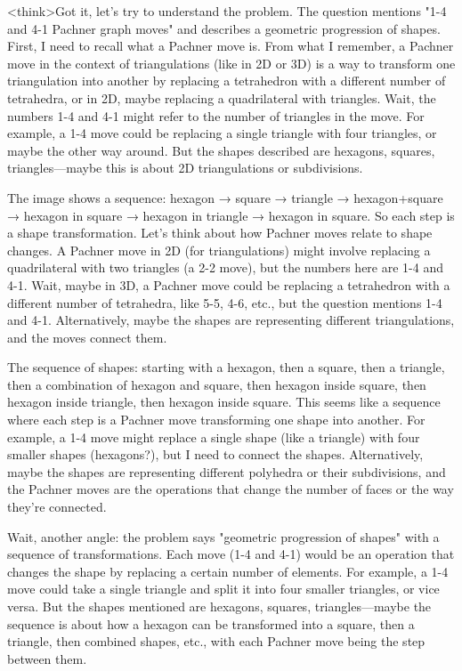 <think>Got it, let's try to understand the problem. The question mentions "1-4 and 4-1 Pachner graph moves" and describes a geometric progression of shapes. First, I need to recall what a Pachner move is. From what I remember, a Pachner move in the context of triangulations (like in 2D or 3D) is a way to transform one triangulation into another by replacing a tetrahedron with a different number of tetrahedra, or in 2D, maybe replacing a quadrilateral with triangles. Wait, the numbers 1-4 and 4-1 might refer to the number of triangles in the move. For example, a 1-4 move could be replacing a single triangle with four triangles, or maybe the other way around. But the shapes described are hexagons, squares, triangles—maybe this is about 2D triangulations or subdivisions.

The image shows a sequence: hexagon → square → triangle → hexagon+square → hexagon in square → hexagon in triangle → hexagon in square. So each step is a shape transformation. Let's think about how Pachner moves relate to shape changes. A Pachner move in 2D (for triangulations) might involve replacing a quadrilateral with two triangles (a 2-2 move), but the numbers here are 1-4 and 4-1. Wait, maybe in 3D, a Pachner move could be replacing a tetrahedron with a different number of tetrahedra, like 5-5, 4-6, etc., but the question mentions 1-4 and 4-1. Alternatively, maybe the shapes are representing different triangulations, and the moves connect them.

The sequence of shapes: starting with a hexagon, then a square, then a triangle, then a combination of hexagon and square, then hexagon inside square, then hexagon inside triangle, then hexagon inside square. This seems like a sequence where each step is a Pachner move transforming one shape into another. For example, a 1-4 move might replace a single shape (like a triangle) with four smaller shapes (hexagons?), but I need to connect the shapes. Alternatively, maybe the shapes are representing different polyhedra or their subdivisions, and the Pachner moves are the operations that change the number of faces or the way they're connected.

Wait, another angle: the problem says "geometric progression of shapes" with a sequence of transformations. Each move (1-4 and 4-1) would be an operation that changes the shape by replacing a certain number of elements. For example, a 1-4 move could take a single triangle and split it into four smaller triangles, or vice versa. But the shapes mentioned are hexagons, squares, triangles—maybe the sequence is about how a hexagon can be transformed into a square, then a triangle, then combined shapes, etc., with each Pachner move being the step between them.

